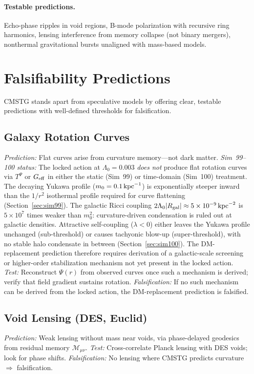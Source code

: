 \documentclass[12pt,a4paper]{article}
\begin{document}
\paragraph{Testable predictions.}
Echo-phase ripples in void regions, B-mode polarization with recursive ring harmonics,
lensing interference from memory collapse (not binary mergers), nonthermal gravitational
bursts unaligned with mass-based models.

\section{Falsifiability Predictions}
\label{sec:falsifiability}

CMSTG stands apart from speculative models by offering clear, testable predictions with
well-defined thresholds for falsification.

\subsection{Galaxy Rotation Curves}
\emph{Prediction:} Flat curves arise from curvature memory---not dark matter.
\emph{Sim~99--100 status:} The locked action at $\Lambda_0=0.003$ \emph{does not}
produce flat rotation curves via $T^\Psi$ or $G_{\rm eff}$ in either the static
(Sim~99) or time-domain (Sim~100) treatment.  The decaying Yukawa profile
($m_0 = 0.1\,{\rm kpc}^{-1}$) is exponentially steeper inward than the
$1/r^2$ isothermal profile required for curve flattening
(Section~\ref{sec:sim99}).  The galactic Ricci coupling
$2\Lambda_0|R_{\rm gal}|\approx5\times10^{-9}\,{\rm kpc}^{-2}$ is $5\times10^7$
times weaker than $m_0^2$: curvature-driven condensation is ruled out at
galactic densities.  Attractive self-coupling ($\lambda<0$) either leaves
the Yukawa profile unchanged (sub-threshold) or causes tachyonic blow-up
(super-threshold), with no stable halo condensate in between
(Section~\ref{sec:sim100}).  The DM-replacement prediction therefore
requires derivation of a galactic-scale screening or higher-order stabilization
mechanism not yet present in the locked action.
\emph{Test:} Reconstruct $\Psi(r)$ from observed curves once such a mechanism
is derived; verify that field gradient sustains rotation.
\emph{Falsification:} If no such mechanism can be derived from the locked action,
the DM-replacement prediction is falsified.

\subsection{Void Lensing (DES, Euclid)}
\emph{Prediction:} Weak lensing without mass near voids, via phase-delayed geodesics
from residual memory $\mathcal{M}_{\mu\nu}$.
\emph{Test:} Cross-correlate Planck lensing with DES voids; look for phase shifts.
\emph{Falsification:} No lensing where CMSTG predicts curvature $\Rightarrow$ falsification.
\end{document}
